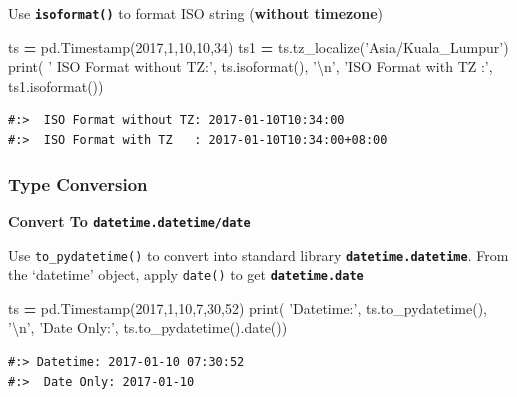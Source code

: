 \documentclass[
]{book}
\newenvironment{Shaded}{\begin{snugshade}}{\end{snugshade}}
\newcommand{\BuiltInTok}[1]{#1}
\newcommand{\CharTok}[1]{\textcolor[rgb]{0.5,0.5,0.5}{#1}}
\newcommand{\DecValTok}[1]{\textcolor[rgb]{0.06,0.06,0.06}{#1}}
\newcommand{\NormalTok}[1]{#1}
\newcommand{\OperatorTok}[1]{\textcolor[rgb]{0.43,0.43,0.43}{\textbf{#1}}}
\newcommand{\StringTok}[1]{\textcolor[rgb]{0.5,0.5,0.5}{#1}}
\begin{document}
Use \textbf{\texttt{isoformat()}} to format ISO string (\textbf{without timezone})

\begin{Shaded}
\begin{Highlighting}[]
\NormalTok{ts }\OperatorTok{=}\NormalTok{ pd.Timestamp(}\DecValTok{2017}\NormalTok{,}\DecValTok{1}\NormalTok{,}\DecValTok{10}\NormalTok{,}\DecValTok{10}\NormalTok{,}\DecValTok{34}\NormalTok{)        }
\NormalTok{ts1 }\OperatorTok{=}\NormalTok{ ts.tz_localize(}\StringTok{'Asia/Kuala_Lumpur'}\NormalTok{) }
\BuiltInTok{print}\NormalTok{( }\StringTok{' ISO Format without TZ:'}\NormalTok{, ts.isoformat(), }\StringTok{'}\CharTok{\textbackslash{}n}\StringTok{'}\NormalTok{,}
       \StringTok{'ISO Format with TZ   :'}\NormalTok{, ts1.isoformat())}
\end{Highlighting}
\end{Shaded}

\begin{verbatim}
#:>  ISO Format without TZ: 2017-01-10T10:34:00 
#:>  ISO Format with TZ   : 2017-01-10T10:34:00+08:00
\end{verbatim}

\hypertarget{type-conversion}{%
\subsubsection{Type Conversion}\label{type-conversion}}

\textbf{Convert To \texttt{datetime.datetime/date}}

Use \texttt{to\_pydatetime()} to convert into standard library \textbf{\texttt{datetime.datetime}}. From the `datetime' object, apply \texttt{date()} to get \textbf{\texttt{datetime.date}}

\begin{Shaded}
\begin{Highlighting}[]
\NormalTok{ts }\OperatorTok{=}\NormalTok{ pd.Timestamp(}\DecValTok{2017}\NormalTok{,}\DecValTok{1}\NormalTok{,}\DecValTok{10}\NormalTok{,}\DecValTok{7}\NormalTok{,}\DecValTok{30}\NormalTok{,}\DecValTok{52}\NormalTok{)}
\BuiltInTok{print}\NormalTok{(}
  \StringTok{'Datetime:'}\NormalTok{,  ts.to_pydatetime(), }\StringTok{'}\CharTok{\textbackslash{}n}\StringTok{'}\NormalTok{,}
  \StringTok{'Date Only:'}\NormalTok{, ts.to_pydatetime().date())}
\end{Highlighting}
\end{Shaded}

\begin{verbatim}
#:> Datetime: 2017-01-10 07:30:52 
#:>  Date Only: 2017-01-10
\end{verbatim}
\end{document}
